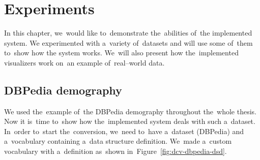 \chapter{Experiments}
\label{ch:experiments}

In this chapter, we~would like to~demonstrate the~abilities of~the implemented system. We
experimented with a~variety of~datasets and will use some of~them to~show how 
the system works. We~will also present how the~implemented visualizers work on~an example of~real--world data.

\section{DBPedia demography}
We used the~example of~the DBPedia demography throughout the~whole thesis. Now 
it is~time to~show how the~implemented system deals with such a~dataset. In~order to~start the~conversion, we~need to~have a~dataset (DBPedia) and a~vocabulary containing a~data structure definition. We~made a~custom vocabulary 
with a~definition as~shown in~Figure~\ref{fig:dcv-dbpedia-dsd}.

